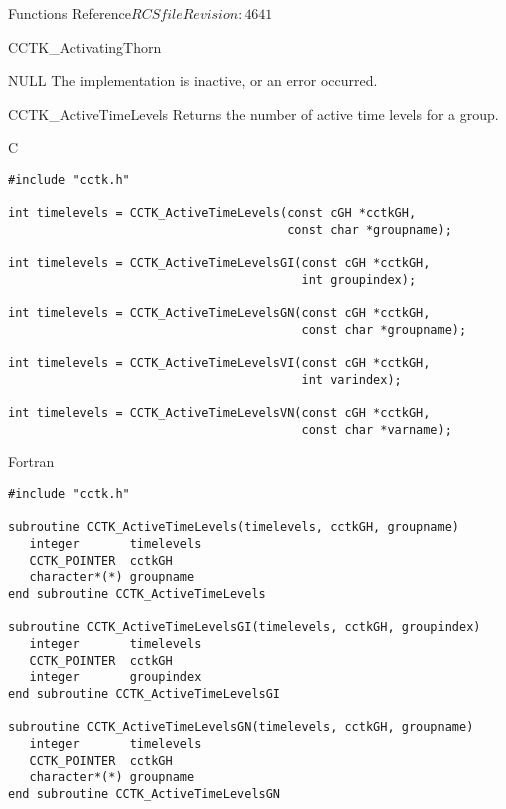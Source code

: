 \begin{cactuspart}{ Functions Reference}{$RCSfile$}{$Revision: 4641 $}
\begin{FunctionDescription}{CCTK\_ActivatingThorn}
\begin{ErrorSection}
\begin{Error}{NULL}
The implementation is inactive, or an error occurred.
\end{Error}
\end{ErrorSection}
\end{FunctionDescription}



\begin{FunctionDescription}{CCTK\_ActiveTimeLevels}
\label{CCTK-ActiveTimeLevels}
Returns the number of active time levels for a group.

\begin{SynopsisSection}
\begin{Synopsis}{C}
\begin{verbatim}
#include "cctk.h"

int timelevels = CCTK_ActiveTimeLevels(const cGH *cctkGH,
                                       const char *groupname);

int timelevels = CCTK_ActiveTimeLevelsGI(const cGH *cctkGH,
                                         int groupindex);

int timelevels = CCTK_ActiveTimeLevelsGN(const cGH *cctkGH,
                                         const char *groupname);

int timelevels = CCTK_ActiveTimeLevelsVI(const cGH *cctkGH,
                                         int varindex);

int timelevels = CCTK_ActiveTimeLevelsVN(const cGH *cctkGH,
                                         const char *varname);
\end{verbatim}
\end{Synopsis}
\begin{Synopsis}{Fortran}
\begin{verbatim}
#include "cctk.h"

subroutine CCTK_ActiveTimeLevels(timelevels, cctkGH, groupname)
   integer       timelevels
   CCTK_POINTER  cctkGH
   character*(*) groupname
end subroutine CCTK_ActiveTimeLevels

subroutine CCTK_ActiveTimeLevelsGI(timelevels, cctkGH, groupindex)
   integer       timelevels
   CCTK_POINTER  cctkGH
   integer       groupindex
end subroutine CCTK_ActiveTimeLevelsGI

subroutine CCTK_ActiveTimeLevelsGN(timelevels, cctkGH, groupname)
   integer       timelevels
   CCTK_POINTER  cctkGH
   character*(*) groupname
end subroutine CCTK_ActiveTimeLevelsGN


\end{verbatim}
\end{Synopsis}
\end{SynopsisSection}
\end{FunctionDescription}
\end{cactuspart}
